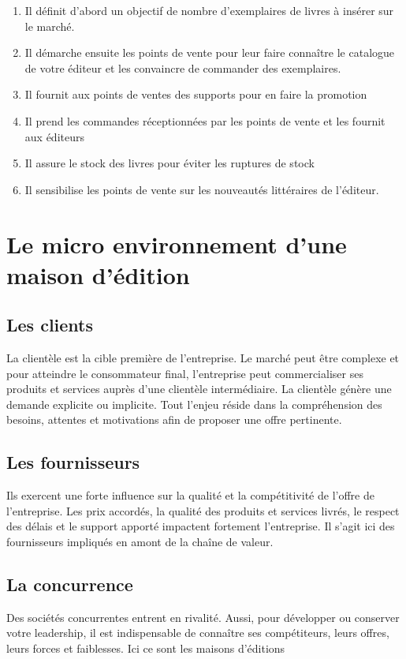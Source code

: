 \documentclass[a4paper, 13pt]{article}
\begin{document}
\begin{itemize}
    \begin{enumerate}
        \item Il définit d'abord un objectif de nombre d'exemplaires de livres à insérer sur le marché.
        \item Il démarche ensuite les points de vente pour leur faire connaître le catalogue de votre éditeur et les convaincre de commander des exemplaires.
        \item Il fournit aux points de ventes des supports pour en faire la promotion
        \item Il prend les commandes réceptionnées par les points de vente et les fournit aux éditeurs
        \item Il assure le stock des livres pour éviter les ruptures de stock
        \item Il sensibilise les points de vente sur les nouveautés littéraires de l’éditeur.
    \end{enumerate}
\end{itemize}

\section{Le micro environnement d'une maison d'édition}
\subsection{Les clients}
La clientèle est la cible première de l'entreprise. Le marché peut être complexe et pour atteindre le consommateur final, l'entreprise peut commercialiser ses produits et services auprès d'une clientèle intermédiaire. La clientèle génère une demande explicite ou implicite. Tout l'enjeu réside dans la compréhension des besoins, attentes et motivations afin de proposer une offre pertinente.
\subsection{Les fournisseurs}
Ils exercent une forte influence sur la qualité et la compétitivité de l'offre de l'entreprise. Les prix accordés, la qualité des produits et services livrés, le respect des délais et le support apporté impactent fortement l'entreprise. Il s'agit ici des fournisseurs impliqués en amont de la chaîne de valeur.
\subsection{La concurrence}
Des sociétés concurrentes entrent en rivalité. Aussi, pour développer ou conserver votre leadership, il est indispensable de connaître ses compétiteurs, leurs offres, leurs forces et faiblesses. Ici ce sont les maisons d'éditions
\end{document}
